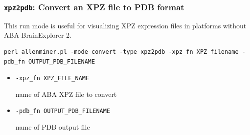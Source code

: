 \documentclass[10pt]{article}
\begin{document}
\subsubsection*{{\tt xpz2pdb}: Convert an XPZ file to PDB format}

This run mode is useful for visualizing XPZ expression files in platforms without ABA BrainExplorer 2.

\begin{lstlisting}
perl allenminer.pl -mode convert -type xpz2pdb -xpz_fn XPZ_filename -pdb_fn OUTPUT_PDB_FILENAME 
\end{lstlisting}

\begin{itemize}
\item {\tt -xpz\_fn XPZ\_FILE\_NAME}

name of ABA XPZ file to convert

\item {\tt -pdb\_fn OUTPUT\_PDB\_FILENAME}

name of PDB output file
\end{itemize}


%
%
%
%


%
%
%
%
\end{document}
